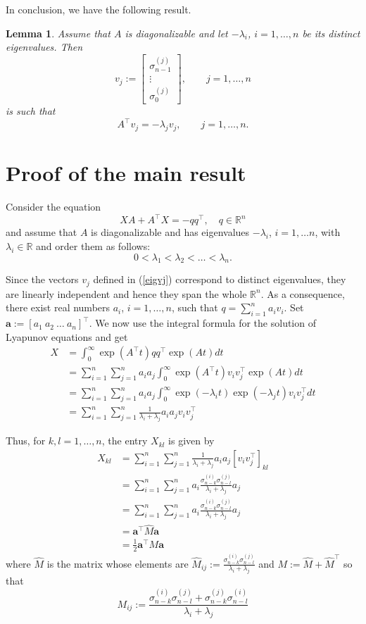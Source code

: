 \documentclass[10pt,a4paper]{amsart}
\def\R{\mathbb{R}}
\newcommand{\tp}{^{\top}}
\newcommand{\beq}{\begin{equation}}
\newcommand{\eeq}{\end{equation}}
\newcommand{\nn}{\nonumber}
\newtheorem{lemma}{Lemma}[section]
\begin{document}
In conclusion, we have the following result.
\begin{lemma}
Assume that $A$ is diagonalizable and let $-\lambda_i$, $i=1,\dots,n$ be its distinct eigenvalues.
Then
\beq\label{eigvj}
v_j:=\begin{bmatrix} \sigma_{n-1}^{(j)}\\ \vdots\\ \sigma_0^{(j)}\end{bmatrix},\qquad j=1,\dots,n
\eeq
is such that
$$
A\tp v_j=-\lambda_j v_j,\qquad j=1,\dots,n.$$
\end{lemma}




\section{Proof of the main result}


Consider the equation 
\beq
\label{lyap-red}
XA+A\tp X=-qq\tp,\quad q\in\R^n
\eeq
and assume that $A$ is diagonalizable and has eigenvalues
$-\lambda_i$, $i=1,\dots n$, with $\lambda_i\in\R$ 
and order them as follows:
$$0<\lambda_1 < \lambda_2 <\dots< \lambda_n.
$$

Since the vectors $v_j$ defined in (\ref{eigvj}) correspond to distinct eigenvalues, they are linearly independent and hence they span the whole $\R^n$.
As a consequence, there exist real numbers $a_i$, $i=1,\dots,n$, such that
$q=\sum_{i=1}^n a_i v_i$.
Set $\mathbf{a}:=[a_1\ a_2\ \dots\  a_n]^\top$.
We now use the integral formula for the solution of Lyapunov equations and get
\begin{align} \nn
X&=\int_{0}^{\infty}\exp(A\tp t)qq\tp\exp(A t)dt 
\\
\nn
&=
  \sum_{i=1}^n
  \sum_{j=1}^n
  a_ia_j
  \int_{0}^{\infty}\exp(A\tp t)v_i v_j\tp\exp(A t)dt 
  \\
  \nn
  &=
  \sum_{i=1}^n
  \sum_{j=1}^n
  a_ia_j
  \int_{0}^{\infty}\exp(-\lambda_i t)\exp(-\lambda_j t) v_i v_j\tp dt 
  \\
  &=
  \sum_{i=1}^n
  \sum_{j=1}^n
  \frac{1}{\lambda_i +\lambda_j}
  a_ia_j v_i v_j\tp 
\end{align} 

Thus, for $k,l=1,\dots,n$, the entry $X_{kl}$ is given by
\begin{align} \nn
X_{kl}&=
  \sum_{i=1}^n
  \sum_{j=1}^n
  \frac{1}{\lambda_i +\lambda_j}
  a_ia_j [v_i v_j\tp]_{kl}\\
  \nn
  &=
  \sum_{i=1}^n
  \sum_{j=1}^n
  a_i
  \frac{\sigma_{n-k}^{(i)}\sigma_{n-l}^{(j)}}{\lambda_i +\lambda_j}
  a_j\\
  \nn
  &=
  \sum_{i=1}^n
  \sum_{j=1}^n
  a_i
  \frac{\sigma_{n-k}^{(i)}\sigma_{n-l}^{(j)}}{\lambda_i +\lambda_j}
  a_j\\
  \nn
  &=
  \mathbf{a}^\top \hat{M} \mathbf{a}\\
 &=
  \frac{1}{2} \mathbf{a}^\top M \mathbf{a}
\end{align}
where $\hat{M}$ is the matrix whose elements are $\hat{M}_{ij}:=\frac{\sigma_{n-k}^{(i)}\sigma_{n-l}^{(j)}}{\lambda_i +\lambda_j}$ and $M:=\hat{M}+\hat{M}\tp$ so that 
$$M_{ij}:=\frac{\sigma_{n-k}^{(i)}\sigma_{n-l}^{(j)}+\sigma_{n-k}^{(j)}\sigma_{n-l}^{(i)}}{\lambda_i +\lambda_j}$$
\end{document}

